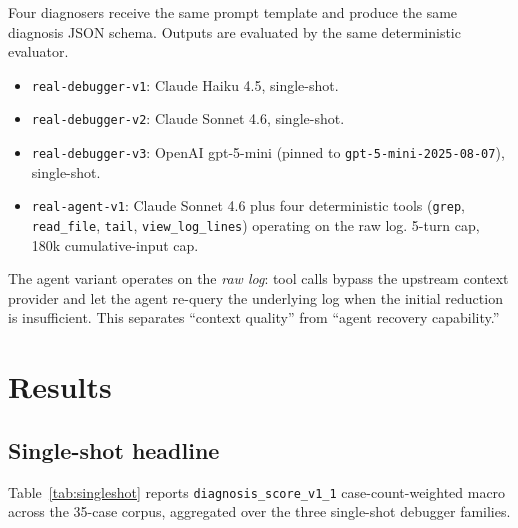 \documentclass{article}
\begin{document}
Four diagnosers receive the same prompt template and produce the
same diagnosis JSON schema. Outputs are evaluated by the same
deterministic evaluator.

\begin{itemize}
  \item \texttt{real-debugger-v1}: Claude Haiku 4.5, single-shot.
  \item \texttt{real-debugger-v2}: Claude Sonnet 4.6, single-shot.
  \item \texttt{real-debugger-v3}: OpenAI gpt-5-mini (pinned to \texttt{gpt-5-mini-2025-08-07}), single-shot.
  \item \texttt{real-agent-v1}: Claude Sonnet 4.6 plus four
        deterministic tools (\texttt{grep}, \texttt{read\_file},
        \texttt{tail}, \texttt{view\_log\_lines}) operating on the
        raw log. 5-turn cap, 180k cumulative-input cap.
\end{itemize}

The agent variant operates on the \emph{raw log}: tool calls bypass
the upstream context provider and let the agent re-query the
underlying log when the initial reduction is insufficient. This
separates ``context quality'' from ``agent recovery capability.''

\section{Results}

\subsection{Single-shot headline}
\label{sec:headline}

Table~\ref{tab:singleshot} reports \texttt{diagnosis\_score\_v1\_1}
case-count-weighted macro across the 35-case corpus, aggregated over
the three single-shot debugger families.
\end{document}
